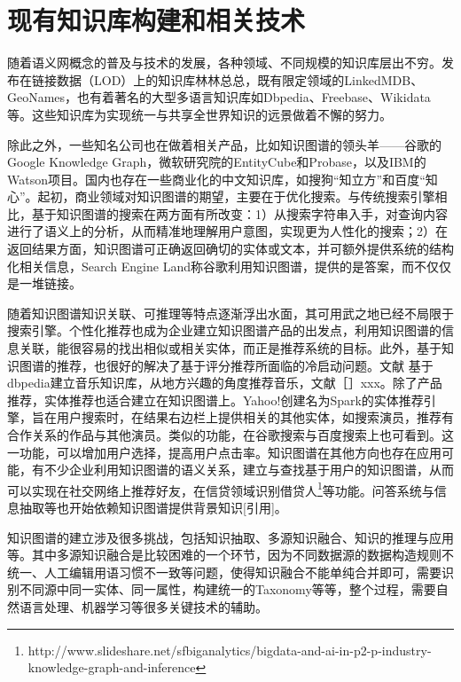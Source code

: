 \section{现有知识库构建和相关技术}
\label{sec:knowledgebase-research}

随着语义网概念的普及与技术的发展，各种领域、不同规模的知识库层出不穷。发布在链接数据（LOD）上的知识库林林总总，既有限定领域的LinkedMDB\cite{erxleben2014introducing}、GeoNames\cite{wick2011geonames}，也有着著名的大型多语言知识库如Dbpedia、Freebase、Wikidata等。这些知识库为实现统一与共享全世界知识的远景做着不懈的努力。

除此之外，一些知名公司也在做着相关产品，比如知识图谱的领头羊——谷歌的Google Knowledge Graph\cite{singhal2012introducing}，微软研究院的EntityCube\cite{nie2012statistical}和Probase\cite{wu2012probase}，以及IBM的Watson项目\cite{ferrucci2012introduction}。国内也存在一些商业化的中文知识库，如搜狗“知立方”和百度“知心”。起初，商业领域对知识图谱的期望，主要在于优化搜索。与传统搜索引擎相比，基于知识图谱的搜索在两方面有所改变：1）从搜索字符串入手，对查询内容进行了语义上的分析，从而精准地理解用户意图，实现更为人性化的搜索；2）在返回结果方面，知识图谱可正确返回确切的实体或文本，并可额外提供系统的结构化相关信息，Search Engine Land称谷歌利用知识图谱，提供的是答案，而不仅仅是一堆链接\cite{sullivan2012google}。

随着知识图谱知识关联、可推理等特点逐渐浮出水面，其可用武之地已经不局限于搜索引擎。个性化推荐也成为企业建立知识图谱产品的出发点\cite{Burke00knowledge,aggarwal2016knowledge}，利用知识图谱的信息关联，能很容易的找出相似或相关实体，而正是推荐系统的目标。此外，基于知识图谱的推荐，也很好的解决了基于评分推荐所面临的冷启动问题。文献\cite{passant2010dbrec,kaminskas2012knowledge} 基于dbpedia建立音乐知识库，从地方兴趣的角度推荐音乐，文献［］xxx。除了产品推荐，实体推荐也适合建立在知识图谱上。Yahoo!创建名为Spark的实体推荐引擎\cite{blanco2013entity}，旨在用户搜索时，在结果右边栏上提供相关的其他实体，如搜索演员，推荐有合作关系的作品与其他演员。类似的功能，在谷歌搜索与百度搜索上也可看到。这一功能，可以增加用户选择，提高用户点击率。知识图谱在其他方向也存在应用可能，有不少企业利用知识图谱的语义关系，建立与查找基于用户的知识图谱，从而可以实现在社交网络上推荐好友\cite{venkataramani2012tao}，在信贷领域识别借贷人\footnote{http://www.slideshare.net/sfbiganalytics/bigdata-and-ai-in-p2-p-industry-knowledge-graph-and-inference}等功能。问答系统与信息抽取等也开始依赖知识图谱提供背景知识[引用]。

知识图谱的建立涉及很多挑战，包括知识抽取、多源知识融合、知识的推理与应用等。其中多源知识融合是比较困难的一个环节，因为不同数据源的数据构造规则不统一、人工编辑用语习惯不一致等问题，使得知识融合不能单纯合并即可，需要识别不同源中同一实体、同一属性，构建统一的Taxonomy等等，整个过程，需要自然语言处理、机器学习等很多关键技术的辅助。

